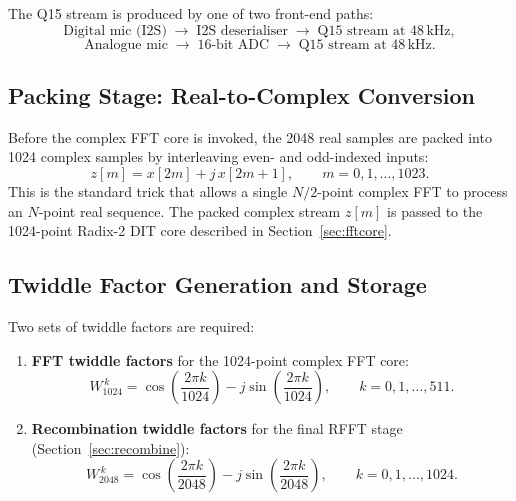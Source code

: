 \documentclass[12pt, a4paper]{article}
\begin{document}
The Q15 stream is produced by one of two front-end paths:
\begin{equation}
    \text{Digital mic (I2S)} \;\longrightarrow\;
    \text{I2S deserialiser} \;\longrightarrow\; \text{Q15 stream at }48\,\text{kHz},
\end{equation}
\begin{equation}
    \text{Analogue mic} \;\longrightarrow\;
    \text{16-bit ADC} \;\longrightarrow\; \text{Q15 stream at }48\,\text{kHz}.
\end{equation}

\subsection{Packing Stage: Real-to-Complex Conversion}

Before the complex FFT core is invoked, the 2048 real samples are packed into
1024 complex samples by interleaving even- and odd-indexed inputs:
\begin{equation}
    z[m] = x[2m] + j\,x[2m+1], \qquad m = 0, 1, \ldots, 1023.
\end{equation}
This is the standard trick that allows a single $N/2$-point complex FFT to
process an $N$-point real sequence.
The packed complex stream $z[m]$ is passed to the 1024-point Radix-2 DIT core
described in Section~\ref{sec:fftcore}.

\subsection{Twiddle Factor Generation and Storage}

Two sets of twiddle factors are required:
\begin{enumerate}[leftmargin=*, label=\alph*)]
    \item \textbf{FFT twiddle factors} for the 1024-point complex FFT core:
        \begin{equation}
            W_{1024}^{\,k} = \cos\!\left(\frac{2\pi k}{1024}\right)
                           - j\sin\!\left(\frac{2\pi k}{1024}\right),
            \qquad k = 0, 1, \ldots, 511.
        \end{equation}
    \item \textbf{Recombination twiddle factors} for the final RFFT stage
        (Section~\ref{sec:recombine}):
        \begin{equation}
            W_{2048}^{\,k} = \cos\!\left(\frac{2\pi k}{2048}\right)
                           - j\sin\!\left(\frac{2\pi k}{2048}\right),
            \qquad k = 0, 1, \ldots, 1024.
        \end{equation}
\end{enumerate}
\end{document}
